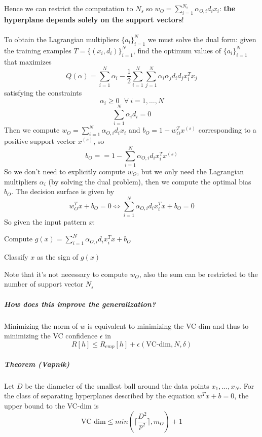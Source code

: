 \documentclass[10pt]{report}
\begin{document}
Hence we can restrict the computation to $N_s$ so $w_O=\sum_{i=1}^{N_s} \alpha_{O,i}d_ix_i$: \textbf{the hyperplane depends solely on the support vectors}!\\\\
To obtain the Lagrangian multipliers $\{a_i\}_{i=1}^N$ we must solve the dual form: given the training examples $T = \{(x_i, d_i)\}_{i=1}^N$, find the optimum values of $\{a_i\}_{i=1}^N$ that maximizes $$Q(\alpha) = \sum_{i=1}^N \alpha_i - \frac{1}{2}\sum_{i=1}^N\sum_{j=1}^N\alpha_i\alpha_jd_id_jx_i^Tx_j$$ satisfying the constraints $$\alpha_i\geq 0\:\:\:\forall\:i=1,\ldots,N$$ $$\sum_{i=1}^N\alpha_id_i = 0$$
Then we compute $w_O = \sum_{i=1}^N\alpha_{O,i}d_ix_i$ and $b_O = 1-w_O^Tx^{(s)}$ corresponding to a positive support vector $x^{(s)}$, so $$b_O = = 1-\sum_{i=1}^N\alpha_{O,i}d_ix_i^Tx^{(s)}$$
So we don't need to explicitly compute $w_O$, but we only need the Lagrangian multipliers $\alpha_i$ (by solving the dual problem), then we compute the optimal bias $b_O$. The decision surface is given by $$w_O^Tx + b_O = 0 \Leftrightarrow\sum_{i=1}^N\alpha_{O,i}d_i x_i^Tx + b_O = 0$$
So given the input pattern $x$:
\begin{list}{}{}
	\item Compute $g(x) = \sum_{i=1}^N \alpha_{O,i}d_ix_i^Tx + b_O$
	\item Classify $x$ as the sign of $g(x)$
\end{list}
Note that it's not necessary to compute $w_O$, also the sum can be restricted to the number of support vector $N_s$
\subparagraph{How does this improve the generalization?} Minimizing the norm of $w$ is equivalent to minimizing the VC-dim and thus to minimizing the VC confidence $\epsilon$ in $$R[h] \leq R_{emp}[h] + \epsilon(\text{VC-dim}, N, \delta)$$
\subparagraph{Theorem (Vapnik)} Let $D$ be the diameter of the smallest ball around the data points $x_1,\ldots,x_N$. For the class of separating hyperplanes described by the equation $w^Tx+b = 0$, the upper bound to the VC-dim is $$\text{VC-dim} \leq min(\lceil\frac{D^2}{p^2}\rceil, m_O) + 1$$
\end{document}
